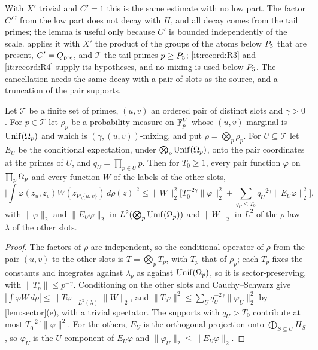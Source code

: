 With $X'$ trivial and $C'=1$ this is the same estimate with no low part.
The factor $C'^{\gamma}$ from the low part does not decay with $H$, and all
decay comes from the tail primes; the lemma is useful only because $C'$ is
bounded independently
of the scale.  applies it with $X'$ the product of the
groups of the atoms below $P_5$ that are present, $C'=Q_{\rm pre}$, and
$\mathcal T$ the tail primes $p\ge P_5$; \ref{it:record:R3} and
\ref{it:record:R4} supply its hypotheses, and no mixing is used below $P_5$.
The cancellation needs the same decay with a pair of slots as the source, and
a truncation of the pair supports.

\begin{lemma}\label{lem:tr:pairsupport}
Let $\mathcal T$ be a finite set of primes, $(u,v)$ an ordered pair of distinct
slots and $\gamma>0$. For $p\in\mathcal T$ let $\rho_p$ be a probability measure
on $\mathbb F_p^V$ whose $(u,v)$-marginal is $\operatorname{Unif}(\Omega_{p})$ and which is
$(\gamma,(u,v))$-mixing, and put $\rho=\bigotimes_p\rho_p$. For $U\subseteq\mathcal T$
let $E_U$ be the conditional expectation, under $\bigotimes_p\operatorname{Unif}(\Omega_{p})$, onto
the pair coordinates at the primes of $U$, and $q_U=\prod_{p\in U}p$. Then for
$T_0\ge1$, every pair function $\varphi$ on $\prod_p\Omega_{p}$ and every function $W$
of the labels of the other slots,
\[
 \Big|\int\varphi(z_u,z_v)W(z_{V\setminus\{u,v\}})\,d\rho(z)\Big|^2
 \le\|W\|_2^2\Big[T_0^{-2\gamma}\|\varphi\|_2^2
 +\sum_{q_U\le T_0}q_U^{-2\gamma}\|E_U\varphi\|_2^2\Big],
\]
with $\|\varphi\|_2$ and $\|E_U\varphi\|_2$ in $L^2(\bigotimes_p\operatorname{Unif}(\Omega_{p}))$ and
$\|W\|_2$ in $L^2$ of the $\rho$-law $\lambda$ of the other slots.
\end{lemma}

\begin{proof}
The factors of $\rho$ are independent, so the conditional operator of $\rho$
from the pair $(u,v)$ to the other slots is $T=\bigotimes_pT_p$, with $T_p$
that of $\rho_p$;
each $T_p$ fixes the constants and integrates against $\lambda_p$ as against
$\operatorname{Unif}(\Omega_{p})$, so it is sector-preserving, with $\|T_p^\circ\|\le p^{-\gamma}$.
Conditioning on the other slots and Cauchy--Schwarz give
$|\int\varphi W\,d\rho|\le\|T\varphi\|_{L^2(\lambda)}\|W\|_2$, and
$\|T\varphi\|^2\le\sum_Uq_U^{-2\gamma}\|\varphi_U\|_2^2$ by \cref{lem:sector}(e),
with a trivial spectator. The
supports with $q_U>T_0$ contribute at most $T_0^{-2\gamma}\|\varphi\|^2$. For the
others, $E_U$ is the orthogonal projection onto $\bigoplus_{S\subseteq U}H_S$, so
$\varphi_U$ is the $U$-component of $E_U\varphi$ and
$\|\varphi_U\|_2\le\|E_U\varphi\|_2$.
\end{proof}

